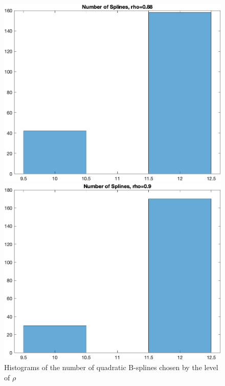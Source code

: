 \documentclass[
]{article}
\begin{document}
\begin{figure}
\begin{minipage}{0.50\linewidth}
\includegraphics{../figures/hist_n_spli_rho-0.88_finer_grid.png}\end{minipage}%
%
\begin{minipage}{0.50\linewidth}
\includegraphics{../figures/hist_n_spli_rho-0.9_finer_grid.png}\end{minipage}%

\caption{\label{fig-hist-n-splies-finer-8}Histograms of the number of
quadratic B-splines chosen by the level of \(\rho\)}

\end{figure}%
\end{document}
